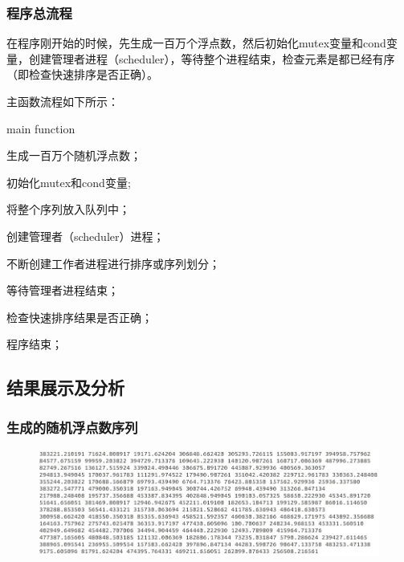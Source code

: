 \documentclass[UTF8]{ctexart}
\begin{document}
\subsubsection{程序总流程}
在程序刚开始的时候，先生成一百万个浮点数，然后初始化mutex变量和cond变量，创建管理者进程（scheduler），等待整个进程结束，检查元素是都已经有序（即检查快速排序是否正确）。\par
主函数流程如下所示：\par
\begin{algorithm}
\caption{main function}
\begin{algorithmic}[1]
\STATE 生成一百万个随机浮点数；\par
\STATE 初始化mutex和cond变量;\par
\STATE 将整个序列放入队列中；\par
\STATE 创建管理者（scheduler）进程；\par
\STATE \qquad 不断创建工作者进程进行排序或序列划分；\par
\STATE 等待管理者进程结束；\par
\STATE 检查快速排序结果是否正确；\par
\STATE 程序结束；\par
\end{algorithmic}
\end{algorithm}

\subsection{结果展示及分析}
\subsubsection{生成的随机浮点数序列}
\begin{figure}[!h]
\centering
\includegraphics[scale = 0.7,bb=0 0 633 197]{2_random.jpg}
\label{img2}
\end{figure}
\end{document}
